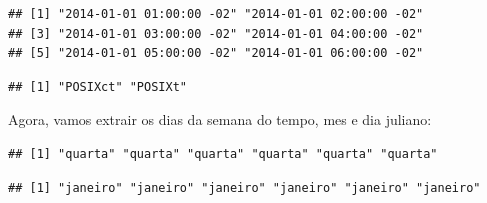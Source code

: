 \documentclass[]{book}
\newenvironment{Shaded}{\begin{snugshade}}{\end{snugshade}}
\newcommand{\KeywordTok}[1]{\textcolor[rgb]{0.13,0.29,0.53}{\textbf{#1}}}
\newcommand{\StringTok}[1]{\textcolor[rgb]{0.31,0.60,0.02}{#1}}
\newcommand{\OperatorTok}[1]{\textcolor[rgb]{0.81,0.36,0.00}{\textbf{#1}}}
\newcommand{\NormalTok}[1]{#1}
\theoremstyle{definition}
\theoremstyle{definition}
\theoremstyle{definition}
\theoremstyle{remark}
\begin{document}
\begin{verbatim}
## [1] "2014-01-01 01:00:00 -02" "2014-01-01 02:00:00 -02"
## [3] "2014-01-01 03:00:00 -02" "2014-01-01 04:00:00 -02"
## [5] "2014-01-01 05:00:00 -02" "2014-01-01 06:00:00 -02"
\end{verbatim}

\begin{Shaded}
\end{Shaded}

\begin{verbatim}
## [1] "POSIXct" "POSIXt"
\end{verbatim}

Agora, vamos extrair os dias da semana do tempo, mes e dia juliano:

\begin{Shaded}
\end{Shaded}

\begin{verbatim}
## [1] "quarta" "quarta" "quarta" "quarta" "quarta" "quarta"
\end{verbatim}

\begin{Shaded}
\end{Shaded}

\begin{verbatim}
## [1] "janeiro" "janeiro" "janeiro" "janeiro" "janeiro" "janeiro"
\end{verbatim}

\begin{Shaded}
\end{Shaded}
\end{document}
